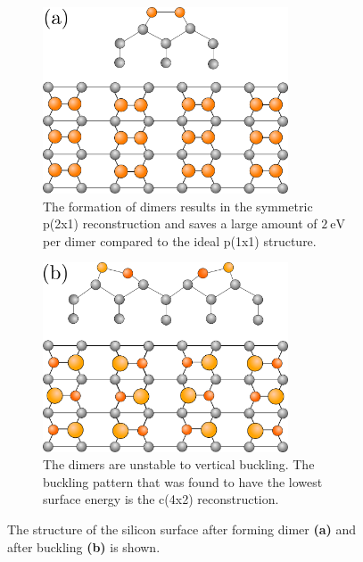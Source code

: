	\begin{figure}[htb]
		\begin{subfigure}{0.5\textwidth}
			\centering
			\includegraphics[width=0.8\textwidth]{graphics/p(2x1)-sym.png}
			\caption{The formation of dimers results in the symmetric p(2x1) reconstruction and saves a large amount of $2~\text{eV}$ per dimer compared to the ideal p(1x1) structure.}
			\label{p(2x1)-symmetric}
		\end{subfigure}
		\begin{subfigure}{0.5\textwidth}
			\centering
			\includegraphics[width=0.8\textwidth]{graphics/c(4x2).png}
			\caption{The dimers are unstable to vertical buckling. The buckling pattern that was found to have the lowest surface energy is the c(4x2) reconstruction.}
			\label{c(4x2)}
		\end{subfigure}
		\caption{The structure of the silicon surface after forming dimer \textbf{(a)} and after buckling \textbf{(b)} is shown.}
		\label{Fig::dimer-configs}
	\end{figure}
